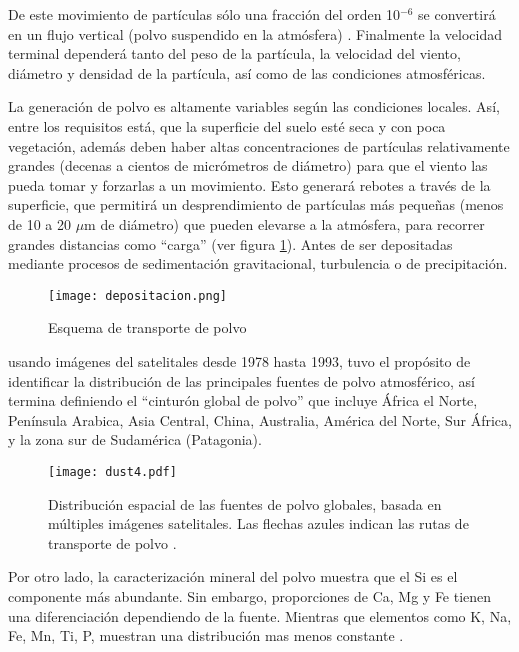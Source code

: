 De este movimiento de partículas sólo una fracción del orden 10$^{-6}$ se convertirá en un flujo vertical (polvo suspendido en la atmósfera) \citep{marticorena1997factors}. Finalmente la velocidad terminal dependerá tanto del peso de la partícula, la velocidad del viento, diámetro y densidad de la partícula, así como de las condiciones atmosféricas.

La generación de polvo es altamente variables según las condiciones locales. Así, entre los requisitos está, que la superficie del suelo esté seca y con poca vegetación, además deben haber altas concentraciones de partículas relativamente grandes (decenas a cientos de micr\'ometros de diámetro) para que el viento las pueda tomar y forzarlas a un movimiento. Esto generará rebotes a través de la superficie, que permitirá un desprendimiento de partículas más pequeñas (menos de 10 a 20 $\mu$m de diámetro) que pueden elevarse a la atmósfera, para recorrer grandes distancias como ``carga'' (ver figura \ref{fig:dust3}). Antes de ser depositadas mediante procesos de sedimentación gravitacional, turbulencia o de precipitación. \newpage

\begin{figure}[H]
\centering
 \texttt{[image: depositacion.png]}
 \caption[Esquema transporte de polvo]{Esquema de transporte de polvo \citep{tegen1994modeling} }
  \label{fig:dust3}
\end{figure}

\cite{prospero2002environmental} usando imágenes del satelitales desde 1978 hasta 1993, tuvo el propósito de identificar la distribución de las principales fuentes de polvo atmosférico, así termina definiendo el ``cinturón global de polvo'' que incluye África el Norte, Península Arabica, Asia Central, China, Australia, América del Norte, Sur África, y la zona sur de Sudamérica (Patagonia). 

\begin{figure}[H]
\centering
 \texttt{[image: dust4.pdf]}
 \caption[Fuentes de polvo]{Distribución espacial de las fuentes de polvo globales, basada en múltiples imágenes satelitales. Las flechas azules indican las rutas de transporte de polvo \citep{muhs2014identifying}.}
  \label{fig:dust4}
\end{figure} 

Por otro lado, la caracterización mineral del polvo muestra que  el Si es el componente más abundante. Sin embargo, proporciones de Ca, Mg y Fe tienen una diferenciación dependiendo de la fuente. Mientras que elementos como K, Na, Fe, Mn, Ti, P, muestran una distribución mas menos constante \citep{scheuvens2013bulk}. 

